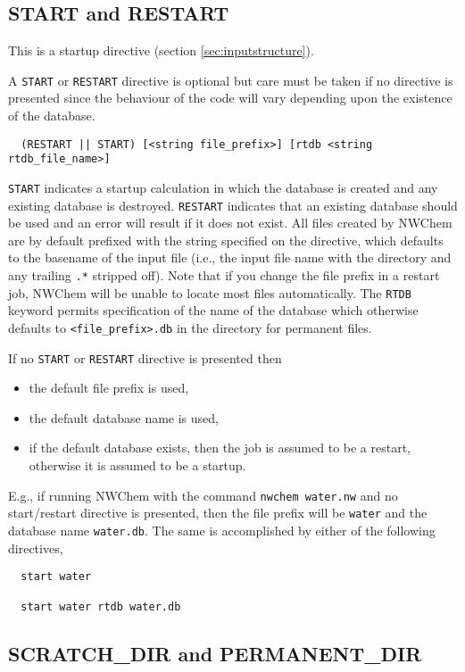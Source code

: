 
\subsection{START and RESTART}
\label{sec:start}

This is a startup directive (section \ref{sec:inputstructure}).

A \verb+START+ or \verb+RESTART+ directive is optional but care must
be taken if no directive is presented since the behaviour of the code
will vary depending upon the existence of the database. 
\begin{verbatim}
  (RESTART || START) [<string file_prefix>] [rtdb <string rtdb_file_name>]
\end{verbatim}
\verb+START+ indicates a startup calculation in which the database is
created and any existing database is destroyed.  \verb+RESTART+
indicates that an existing database should be used and an error will
result if it does not exist.  All files created by NWChem are by
default prefixed with the string specified on the directive, which
defaults to the basename of the input file (i.e., the input file name
with the directory and any trailing \verb+.*+ stripped off).  Note
that if you change the file prefix in a restart job, NWChem will be
unable to locate most files automatically.  The \verb+RTDB+ keyword
permits specification of the name of the database which otherwise
defaults to \verb+<file_prefix>.db+ in the directory for permanent
files.

If no \verb+START+ or \verb+RESTART+ directive is presented then
\begin{itemize}
  \item the default file prefix is used,
  \item the default database name is used,
  \item if the default database exists, then the job is assumed to be
    a restart, otherwise it is assumed to be a startup.
\end{itemize}

E.g., if running NWChem with the command \verb+nwchem water.nw+ and no
start/restart directive is presented, then the file prefix will be
\verb+water+ and the database name \verb+water.db+.  The same is
accomplished by either of the following directives,
\begin{verbatim}
  start water

  start water rtdb water.db
\end{verbatim}

\subsection{SCRATCH\_DIR and PERMANENT\_DIR}
\label{sec:dirs}

